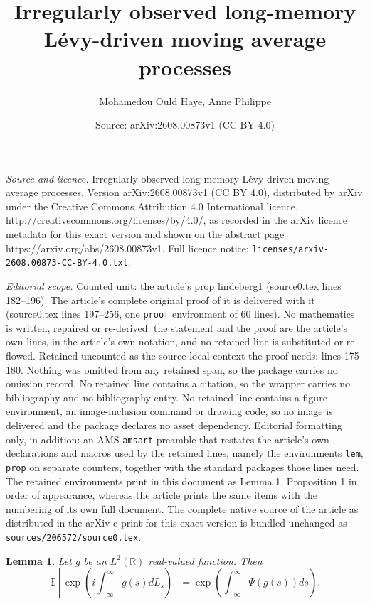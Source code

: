 \documentclass[10pt,a4paper]{amsart}
\title{Irregularly observed long-memory L\'evy-driven moving average processes}
\author{Mohamedou Ould Haye, Anne Philippe}
\date{Source: arXiv:2608.00873v1 (CC BY 4.0)}
\newtheorem{lem}{Lemma}
\begin{document}
\maketitle

\noindent\emph{Source and licence.} Irregularly observed long-memory L\'evy-driven moving average processes. Version arXiv:2608.00873v1 (CC BY 4.0), distributed by arXiv under the Creative Commons Attribution 4.0 International licence, http://creativecommons.org/licenses/by/4.0/, as recorded in the arXiv licence metadata for this exact version and shown on the abstract page https://arxiv.org/abs/2608.00873v1. Full licence notice: \texttt{licenses/arxiv-2608.00873-CC-BY-4.0.txt}.\par\smallskip

\noindent\textit{Editorial scope.} Counted unit: the article's prop lindeberg1 (source0.tex lines 182--196). The article's complete original proof of it is delivered with it (source0.tex lines 197--256, one \texttt{proof} environment of 60 lines). No mathematics is written, repaired or re-derived: the statement and the proof are the article's own lines, in the article's own notation, and no retained line is substituted or re-flowed.  Retained uncounted as the source-local context the proof needs: lines 175--180.  Nothing was omitted from any retained span, so the package carries no omission record.  No retained line contains a citation, so the wrapper carries no bibliography and no bibliography entry.  No retained line contains a figure environment, an image-inclusion command or drawing code, so no image is delivered and the package declares no asset dependency.  Editorial formatting only, in addition: an AMS \texttt{amsart} preamble that restates the article's own declarations and macros used by the retained lines, namely the environments \texttt{lem}, \texttt{prop} on separate counters, together with the standard packages those lines need.  The retained environments print in this document as Lemma 1, Proposition 1 in order of appearance, whereas the article prints the same items with the numbering of its own full document.  The complete native source of the article as distributed in the arXiv e-print for this exact version is bundled unchanged as \texttt{sources/206572/source0.tex}.
\begin{lem}\label{representation}
Let $g$ be an $L^2(\mathbb{R})$ real-valued function. Then
$$
\mathbb{E}\left[\exp\left(i\int_{-\infty}^\infty g(s)dL_s\right)\right]=\exp\left(\int_{-\infty}^\infty\Psi(g(s))ds\right).
$$
\end{lem}
\end{document}
